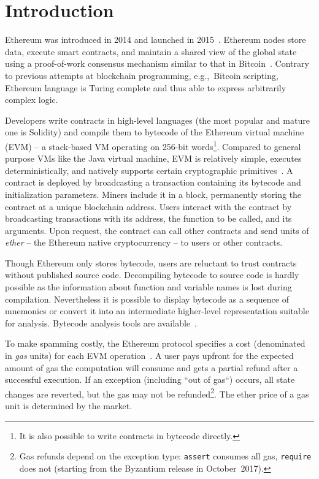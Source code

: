 \section{Introduction}

Ethereum was introduced in 2014 and launched in 2015~\cite{Buterin2014}.
Ethereum nodes store data, execute smart contracts, and maintain a shared view of the global state using a proof-of-work consensus mechanism similar to that in Bitcoin~\cite{Tikhomirov2017}.
Contrary to previous attempts at blockchain programming, e.g.,~Bitcoin scripting, Ethereum language is Turing complete and thus able to express arbitrarily complex logic.

Developers write contracts in high-level languages (the most popular and mature one is Solidity) and compile them to bytecode of the Ethereum virtual machine (EVM) -- a stack-based VM operating on 256-bit words\footnote{It is also possible to write contracts in bytecode directly.}.
Compared to general purpose VMs like the Java virtual machine, EVM is relatively simple, executes deterministically, and natively supports certain cryptographic primitives~\cite{Buterin2017}.
A contract is deployed by broadcasting a transaction containing its bytecode and initialization parameters.
Miners include it in a block, permanently storing the contract at a unique blockchain address.
Users interact with the contract by broadcasting transactions with its address, the function to be called, and its arguments.
Upon request, the contract can call other contracts and send units of \textit{ether} -- the Ethereum native cryptocurrency -- to users or other contracts.

Though Ethereum only stores bytecode, users are reluctant to trust contracts without published source code.
Decompiling bytecode to source code is hardly possible as the information about function and variable names is lost during compilation.
Nevertheless it is possible to display bytecode as a sequence of mnemonics or convert it into an intermediate higher-level representation suitable for analysis.
Bytecode analysis tools are available~\cite{Norvill2017, Suiche2017}.

To make spamming costly, the Ethereum protocol specifies a cost (denominated in \textit{gas} units) for each EVM operation~\cite{Wood2014}.
A user pays upfront for the expected amount of gas the computation will consume and gets a partial refund after a successful execution.
If an exception (including ``out of gas``) occurs, all state changes are reverted, but the gas may not be refunded\footnote{Gas refunds depend on the exception type: \texttt{assert} consumes all gas, \texttt{require} does not (starting from the Byzantium release in October~2017).}.
The ether price of a gas unit is determined by the market.

